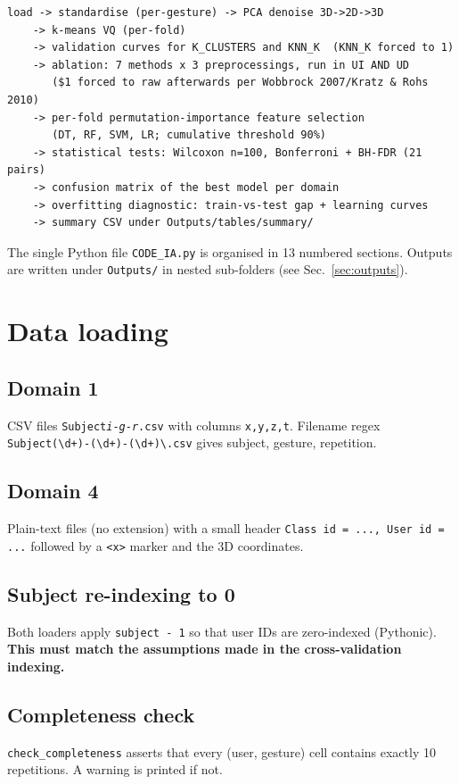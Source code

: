 \documentclass[11pt,a4paper]{article}
\begin{document}
\begin{lstlisting}[caption={Phases as they appear in CODE\_IA.py}]
load -> standardise (per-gesture) -> PCA denoise 3D->2D->3D
    -> k-means VQ (per-fold)
    -> validation curves for K_CLUSTERS and KNN_K  (KNN_K forced to 1)
    -> ablation: 7 methods x 3 preprocessings, run in UI AND UD
       ($1 forced to raw afterwards per Wobbrock 2007/Kratz & Rohs 2010)
    -> per-fold permutation-importance feature selection
       (DT, RF, SVM, LR; cumulative threshold 90%)
    -> statistical tests: Wilcoxon n=100, Bonferroni + BH-FDR (21 pairs)
    -> confusion matrix of the best model per domain
    -> overfitting diagnostic: train-vs-test gap + learning curves
    -> summary CSV under Outputs/tables/summary/
\end{lstlisting}

The single Python file \texttt{CODE\_IA.py} is organised in 13 numbered
sections. Outputs are written under \texttt{Outputs/} in nested
sub-folders (see Sec.~\ref{sec:outputs}).

\section{Data loading}

\subsection{Domain 1}
CSV files \texttt{Subject\textit{i}-\textit{g}-\textit{r}.csv} with
columns \verb|x,y,z,t|. Filename regex
\verb|Subject(\d+)-(\d+)-(\d+)\.csv| gives subject, gesture, repetition.

\subsection{Domain 4}
Plain-text files (no extension) with a small header
\verb|Class id = ..., User id = ...| followed by a \verb|<x>| marker
and the 3D coordinates.

\subsection{Subject re-indexing to 0}
Both loaders apply \verb|subject - 1| so that user IDs are
zero-indexed (Pythonic). \textbf{This must match the assumptions made
in the cross-validation indexing.}

\subsection{Completeness check}
\verb|check_completeness| asserts that every (user, gesture) cell
contains exactly 10 repetitions. A warning is printed if not.
\end{document}
